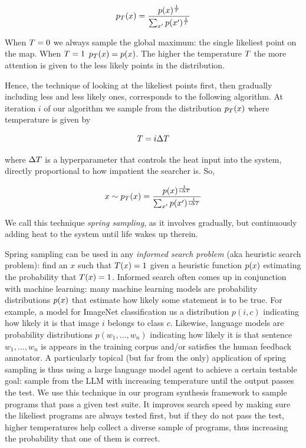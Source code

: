 \begin{equation}
p_T(x) = \frac{p(x)^{\frac{1}{T}}}{\sum_{x'} p(x')^{\frac{1}{T}}}
\end{equation}

When $T=0$ we always sample the global maximum: the single likeliest point on the map. 
When $T=1$ $p_T(x)=p(x)$.
The higher the temperature $T$ the more attention is given to the less likely points in the distribution.

Hence, the technique of looking at the likeliest points first, then gradually including less and less likely ones, corresponds to the following algorithm. At iteration $i$ of our algorithm we sample from the distribution $p_T(x)$ where temperature is given by

\begin{equation}
T = i \Delta T
\end{equation}

where $\Delta T$ is a hyperparameter that controls the heat input into the system, directly proportional to how impatient the searcher is. So,

\begin{equation}
x \sim p_T(x) = \frac{p(x)^{\frac{1}{i \Delta T}}}{\sum_{x'} p(x')^{\frac{1}{i \Delta T}}}
\end{equation}

We call this technique \emph{spring sampling}, as it involves gradually, but continuously adding heat to the system until life wakes up therein.

Spring sampling can be used in any \emph{informed search problem} (aka heuristic search problem): find an $x$ such that $T(x)=1$ given a heuristic function $p(x)$ estimating the probability that $T(x)=1$. 
Informed search often comes up in conjunction with machine learning: many machine learning models are probability distributions $p(x)$ that estimate how likely some statement is to be true.
For example, a model for ImageNet classification \cite{dengImagenetLargescaleHierarchical2009} us a distribution $p(i,c)$ indicating how likely it is that image $i$ belongs to class $c$.
Likewise, language models are probability distributions $p(w_1,\dots,w_n)$ indicating how likely it is that sentence $w_1,\dots,w_n$ is appears in the training corpus and/or satisfies the human feedback annotator.
A particularly topical (but far from the only) application of spring sampling is thus using a large language model agent to achieve a certain testable goal: sample from the LLM with increasing temperature until the output passes the test.
We use this technique in our program synthesis framework to sample programs that pass a given test suite.
It improves search speed by making sure the likeliest programs are always tested first, but if they do not pass the test, higher temperatures help collect a diverse sample of programs, thus increasing the probability that one of them is correct.


